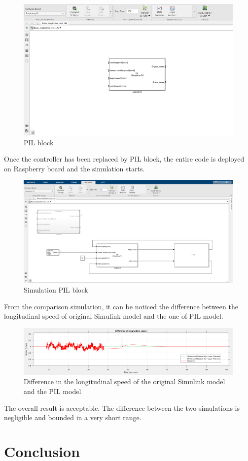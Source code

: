 \documentclass[12pt,a4paper]{report}
\begin{document}
\begin{figure}[htbp]
	\centering
	\includegraphics[scale=0.7]{PIL_block.png}
	\caption{PIL block}
\end{figure} \FloatBarrier
Once the controller has been replaced by PIL block, the entire code is deployed on Raspberry board and the simulation starts. 
\begin{figure}[htbp]
	\centering
	\includegraphics[scale=0.7]{PIL_sim.png}
	\caption{Simulation PIL block}
\end{figure} \FloatBarrier
From the comparison simulation, it can be noticed the difference between the longitudinal speed of original Simulink model and the one of PIL model.
\begin{figure}[htbp]
	\centering
	\includegraphics[scale=1]{plot_PIL.png}
	\caption{Difference in the longitudinal speed of the original Simulink model and the PIL model}
\end{figure} \FloatBarrier

The overall result is acceptable.
The difference between the two simulations is negligible and bounded in a very short range.

\chapter{Conclusion}
	
	
\end{document}
